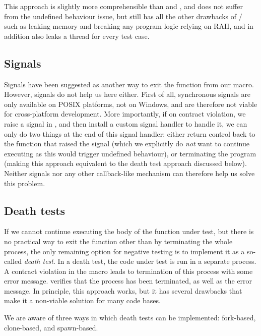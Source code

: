 This approach is slightly more comprehensible than  and , and does not suffer from the undefined behaviour issue, but still has all the other drawbacks of / such as leaking memory and breaking any program logic relying on RAII, and in addition also leaks a thread for every test case.


\subsection{Signals}

Signals have been suggested as another way to exit the function from our  macro. However, signals do not help us here either. First of all, synchronous signals are only available on POSIX platforms, not on Windows, and are therefore not viable for cross-platform development. More importantly, if on contract violation, we raise a signal in , and then install a custom signal handler to handle it, we can only do two things at the end of this signal handler: either return control back to the function that raised the signal (which we explicitly do \emph{not} want to continue executing as this would trigger undefined behaviour), or terminating the program (making this approach equivalent to the death test approach discussed below). Neither signals nor any other callback-like mechanism can therefore help us solve this problem.

\subsection{Death tests}
\label{subsec:deathtests}

If we cannot continue executing the body of the function under test, but there is no practical way to exit the function other than by terminating the whole process, the only remaining option for negative testing is to implement it as a so-called \emph{death test}. In a death test, the code under test is run in a separate process. A contract violation in the  macro leads to termination of this process with some error message.  verifies that the process has been terminated, as well as the error message. In principle, this approach works, but it has several drawbacks that make it a non-viable solution for many code bases.

We are aware of three ways in which death tests can be implemented: fork-based, clone-based, and spawn-based.

